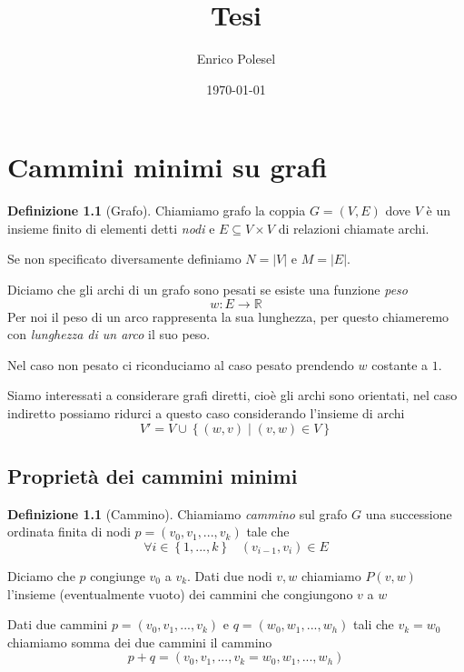 \documentclass[a4paper,10pt]{amsbook}
\title{Tesi}
\author{Enrico Polesel}
\date{\today}
\newcounter{counter1}
\theoremstyle{plain}
\theoremstyle{definition}
\newtheorem{mydef}[counter1]{Definizione}
\theoremstyle{remark}
\newcommand{\set}[1]{\left\{#1\right\}}
\newcommand{\abs}[1]{\left|#1\right|}
\begin{document}
\maketitle

\setcounter{tocdepth}{5}

\tableofcontents

\chapter{Cammini minimi su grafi}

\begin{mydef}[Grafo]
  Chiamiamo grafo la coppia $G = (V,E)$ dove $V$ è un insieme finito
  di elementi detti \textit{nodi} e $E\subseteq V \times V$ di
  relazioni chiamate archi.
\end{mydef}

Se non specificato diversamente definiamo $N = \abs{V}$ e $M =
\abs{E}$.

Diciamo che gli archi di un grafo sono pesati se esiste una funzione
\textit{peso}
\[ w : E \rightarrow \mathbb{R} \]
Per noi il peso di un arco rappresenta la sua lunghezza, per questo
chiameremo con \textit{lunghezza di un arco} il suo peso.

Nel caso non pesato ci riconduciamo al caso pesato prendendo $w$
costante a $1$.

Siamo interessati a considerare grafi diretti, cioè gli archi sono
orientati, nel caso indiretto possiamo ridurci a questo caso
considerando l'insieme di archi 
\[ V' = V \cup \set{ (w,v) \mid (v,w) \in V } \]

\section{Proprietà dei cammini minimi}

\begin{mydef}[Cammino]
  Chiamiamo \textit{cammino} sul grafo $G$ una successione ordinata
  finita di nodi $p = ( v_0, v_1, ..., v_k)$ tale che 
  \[ \forall i \in \set{ 1, ... , k} \;\;\; (v_{i-1}, v_{i} ) \in E\]
\end{mydef}

Diciamo che $p$ congiunge $v_0$ a $v_k$. Dati due nodi $v,w$ chiamiamo
$P(v,w)$ l'insieme (eventualmente vuoto) dei cammini che congiungono
$v$ a $w$

Dati due cammini $p = ( v_0, v_1, ..., v_k)$ e $q = ( w_0, w_1, ...,
w_{h})$ tali che $v_k = w_0$ chiamiamo somma dei due cammini il
cammino
\[ p+q = ( v_0, v_1, ..., v_k= w_0, w_1, ..., w_{h}) \]
\end{document}
